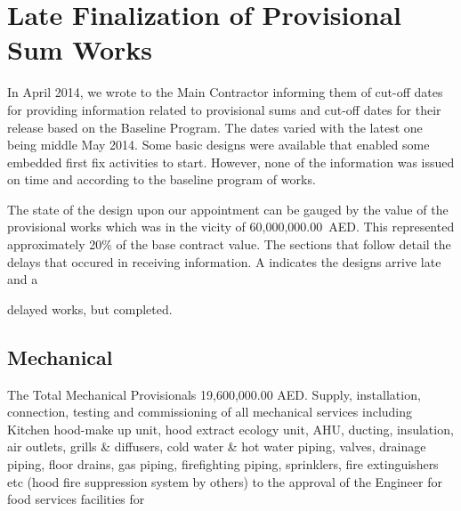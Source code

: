 \def\hot{{\color{red}\scalebox{1.5}{\Fire}} delayed works. }
\def\ghot{{\color{green!80!black}\raggedright\scalebox{1.5}{\Fire}} delayed works, but completed. }
\def\phot{{\color{green!80!black}\raggedright\scalebox{1.5}{\Fire}} delayed works. partially completed. }

\def\check{{$\color{green!80!black}\check$}}
\def\partiald {50\% complete}
\def\unavailable{\hot Design unavailable}

\chapter{Late Finalization of Provisional Sum Works}

In April 2014, we wrote to the Main Contractor informing them of cut-off dates for providing information related to provisional sums and cut-off dates for their release based on the Baseline Program. The dates varied with the latest one being middle May 2014. Some basic designs were available that enabled some embedded first fix activities to start. However, none of the information was issued on time and according to the baseline program of works. 

The state of the design upon our appointment can be gauged by the value of the provisional works which was in the vicity of 60,000,000.00~AED. This represented approximately 20\% of the base contract value. The sections that follow detail the delays that occured in receiving information. A \textcolor{red}{\Fire} indicates the designs arrive late and a \ghot

\section{Mechanical}

The Total Mechanical Provisionals 19,600,000.00 AED.  Supply, installation, connection, testing and commissioning of all mechanical services including Kitchen hood-make up unit, hood extract ecology unit, AHU, ducting, insulation, air outlets, grills \& diffusers, cold water \& hot water piping, valves, drainage piping, floor drains, gas piping, firefighting piping, sprinklers, fire extinguishers etc (hood fire suppression system by others) to the approval of the Engineer for food services facilities for
\medskip

